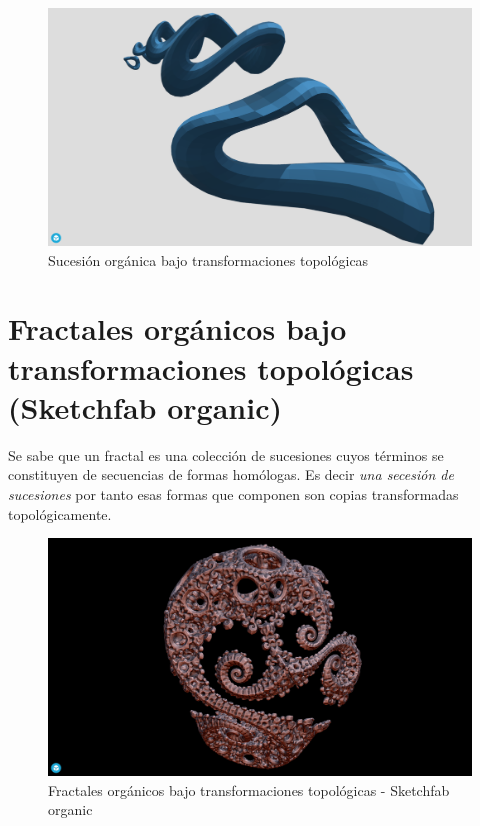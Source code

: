 \documentclass[
  11pt,
]{krantz}
\theoremstyle{definition}
\theoremstyle{definition}
\theoremstyle{definition}
\theoremstyle{definition}
\theoremstyle{remark}
\begin{document}
\begin{figure}[!ht]

{\centering \includegraphics[width=1\linewidth]{sucecion} 

}

\caption{Sucesión orgánica bajo transformaciones topológicas}\label{fig:Suscecion}
\end{figure}

\hypertarget{fractales-orguxe1nicos-bajo-transformaciones-topoluxf3gicas-sketchfab-organic}{%
\section{Fractales orgánicos bajo transformaciones topológicas (Sketchfab organic)}\label{fractales-orguxe1nicos-bajo-transformaciones-topoluxf3gicas-sketchfab-organic}}

Se sabe que un fractal es una colección de sucesiones cuyos términos se constituyen de secuencias de formas homólogas. Es decir \emph{una secesión de sucesiones} por tanto esas formas que componen son copias transformadas topológicamente.

\begin{figure}[!ht]

{\centering \includegraphics[width=1\linewidth]{Sketch} 

}

\caption{Fractales orgánicos bajo transformaciones topológicas - Sketchfab organic}\label{fig:Sketch}
\end{figure}
\end{document}
